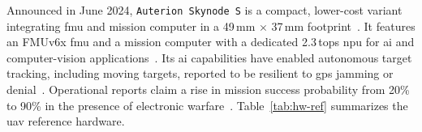 Announced in June 2024, \lstinline|Auterion Skynode S| is a compact, lower-cost
variant integrating \gls{fmu} and mission computer in a 49\,mm \(\times\) 37\,mm
footprint~\cite{skynodeS-pressRelease}.
It features an FMUv6x \gls{fmu} and a mission computer with a dedicated
2.3\,\gls{tops} \gls{npu} for \gls{ai} and computer-vision
applications~\cite{skynodeS-pressRelease}.
Its \gls{ai} capabilities have enabled autonomous target tracking, including
moving targets, reported to be resilient to \gls{gps} jamming or
denial~\cite{skynodeS-noJamming}.
Operational reports claim a rise in mission success probability from 20\% to
90\% in the presence of electronic warfare~\cite{skynodeS-noJamming-2}.
%
Table~\ref{tab:hw-ref} summarizes the \gls{uav} reference hardware.
